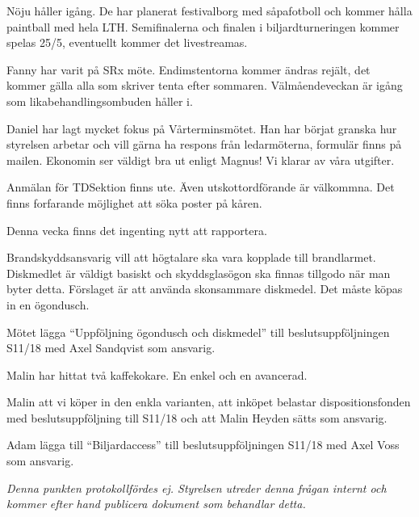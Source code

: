\documentclass[10pt]{article}
\begin{document}
\begin{paragrafer}
\begin{paragrafer}
		Nöju håller igång. De har planerat festivalborg med såpafotboll och kommer hålla paintball med hela LTH. Semifinalerna och finalen i biljardturneringen kommer spelas 25/5, eventuellt kommer det livestreamas.

		Fanny har varit på SRx möte. Endimstentorna kommer ändras rejält, det kommer gälla alla som skriver tenta efter sommaren. Välmåendeveckan är igång som likabehandlingsombuden håller i.

		Daniel har lagt mycket fokus på Vårterminsmötet. Han har börjat granska hur styrelsen arbetar och vill gärna ha respons från ledarmöterna, formulär finns på mailen.
		Ekonomin ser väldigt bra ut enligt Magnus! Vi klarar av våra utgifter.


		Anmälan för TDSektion finns ute. Även utskottordförande är välkommna. Det finns forfarande möjlighet att söka poster på kåren.


		Denna vecka finns det ingenting nytt att rapportera.



		Brandskyddsansvarig vill att högtalare ska vara kopplade till brandlarmet. Diskmedlet är väldigt basiskt och skyddsglasögon ska finnas tillgodo när man byter detta. Förslaget är att använda skonsammare diskmedel. Det måste köpas in en ögondusch.

		Mötet \ypa lägga ``Uppföljning ögondusch och diskmedel'' till beslutsuppföljningen S11/18 med Axel Sandqvist som ansvarig.
	\end{paragrafer}

	Malin har hittat två kaffekokare. En enkel och en avancerad.

	Malin \ypa att vi köper in den enkla varianten, att inköpet belastar dispositionsfonden med beslutsuppföljning till S11/18 och att Malin Heyden sätts som ansvarig.

	\Mbaby


	Adam \ypa lägga till ``Biljardaccess'' till beslutsuppföljningen S11/18 med Axel Voss som ansvarig.

	\Mbaby


	\emph{Denna punkten protokollfördes ej. Styrelsen utreder denna frågan internt och kommer efter hand publicera dokument som behandlar detta.}


\end{paragrafer}
\end{document}
